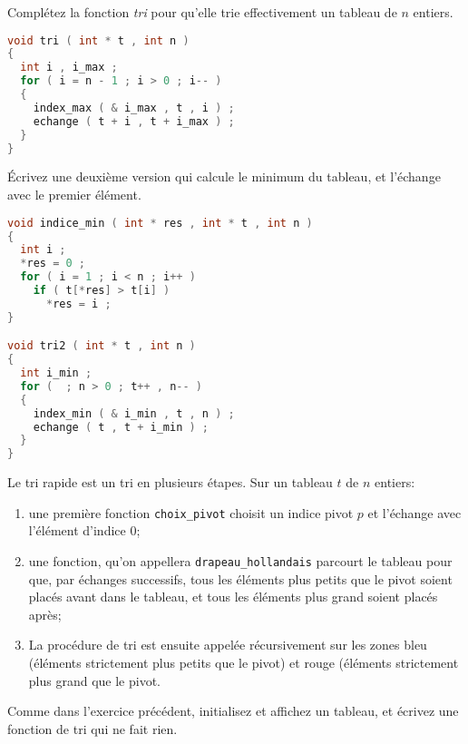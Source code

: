 \question Complétez la fonction \emph{tri} pour qu'elle trie
effectivement un tableau de \(n\) entiers.

\begin{solutioncachee}
  \begin{lstlisting}[language=C]
void tri ( int * t , int n )
{
  int i , i_max ;
  for ( i = n - 1 ; i > 0 ; i-- )
  {
    index_max ( & i_max , t , i ) ;
    echange ( t + i , t + i_max ) ;
  }
}
  \end{lstlisting}
\end{solutioncachee}

\question Écrivez une deuxième version qui calcule le minimum du
tableau, et l'échange avec le premier élément.

\begin{solutioncachee}
  \begin{lstlisting}[language=C]
void indice_min ( int * res , int * t , int n )
{
  int i ;
  *res = 0 ;
  for ( i = 1 ; i < n ; i++ )
    if ( t[*res] > t[i] )
      *res = i ;
}

void tri2 ( int * t , int n )
{
  int i_min ;
  for (  ; n > 0 ; t++ , n-- )
  {
    index_min ( & i_min , t , n ) ;
    echange ( t , t + i_min ) ;
  }
}
  \end{lstlisting}
\end{solutioncachee}


Le tri rapide est un tri en plusieurs étapes. Sur un tableau \(t\) de
\(n\) entiers:
\begin{enumerate}
\item une première fonction \texttt{choix\_pivot} choisit un indice
  pivot \(p\) et l'échange avec l'élément d'indice \(0\);
\item une fonction, qu'on appellera \texttt{drapeau\_hollandais}
  parcourt le tableau pour que, par échanges successifs, tous les
  éléments plus petits que le pivot soient placés avant dans le
  tableau, et tous les éléments plus grand soient placés après;
\item La procédure de tri est ensuite appelée récursivement sur les
  zones bleu (éléments strictement plus petits que le pivot) et rouge
  (éléments strictement plus grand que le pivot.
\end{enumerate}

\question Comme dans l'exercice précédent, initialisez et affichez un
tableau, et écrivez une fonction de tri qui ne fait rien.

